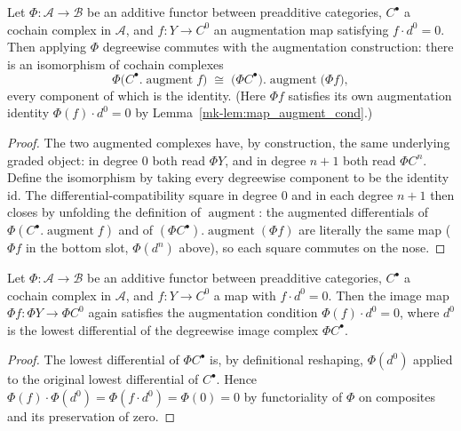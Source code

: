 \begin{lemma}\label{mk-lem:mapHC_augment_iso}
  \leanok

  Let \(\Phi : \mathcal{A} \to \mathcal{B}\) be an additive functor between preadditive
  categories, \(C^\bullet\) a cochain complex in \(\mathcal{A}\), and \(f : Y \to C^0\) an
  augmentation map satisfying \(f \cdot d^0 = 0\). Then applying \(\Phi\) degreewise commutes
  with the augmentation construction: there is an isomorphism of cochain complexes
  \[
    \Phi\bigl(C^\bullet.\operatorname{augment} f\bigr)
      \;\cong\;
    \bigl(\Phi C^\bullet\bigr).\operatorname{augment}\bigl(\Phi f\bigr),
  \]
  every component of which is the identity. (Here \(\Phi f\) satisfies its own augmentation
  identity \(\Phi(f) \cdot d^0 = 0\) by Lemma~\ref{mk-lem:map_augment_cond}.)
\end{lemma}
\begin{proof}
  The two augmented complexes have, by construction, the same underlying graded object:
  in degree \(0\) both read \(\Phi Y\), and in degree \(n+1\) both read \(\Phi C^n\). Define
  the isomorphism by taking every degreewise component to be the identity \(\mathrm{id}\).
  The differential-compatibility square in degree \(0\) and in each
  degree \(n+1\) then closes by unfolding the definition of \(\operatorname{augment}\): the
  augmented differentials of \(\Phi(C^\bullet.\operatorname{augment} f)\) and of
  \((\Phi C^\bullet).\operatorname{augment}(\Phi f)\) are literally the same map
  (\(\Phi f\) in the bottom slot, \(\Phi(d^{n})\) above), so each square commutes on the nose.
\end{proof}

\begin{lemma}\label{mk-lem:map_augment_cond}
  \leanok

  Let \(\Phi : \mathcal{A} \to \mathcal{B}\) be an additive functor between preadditive
  categories, \(C^\bullet\) a cochain complex in \(\mathcal{A}\), and \(f : Y \to C^0\) a map
  with \(f \cdot d^0 = 0\). Then the image map \(\Phi f : \Phi Y \to \Phi C^0\) again satisfies
  the augmentation condition \(\Phi(f) \cdot d^0 = 0\), where \(d^0\) is the lowest differential
  of the degreewise image complex \(\Phi C^\bullet\).
\end{lemma}
\begin{proof}

  The lowest differential of \(\Phi C^\bullet\) is, by definitional reshaping, \(\Phi(d^0)\)
  applied to the original lowest differential of \(C^\bullet\). Hence
  \(\Phi(f) \cdot \Phi(d^0) = \Phi(f \cdot d^0) = \Phi(0) = 0\) by functoriality of \(\Phi\)
  on composites and its preservation of zero.
\end{proof}

